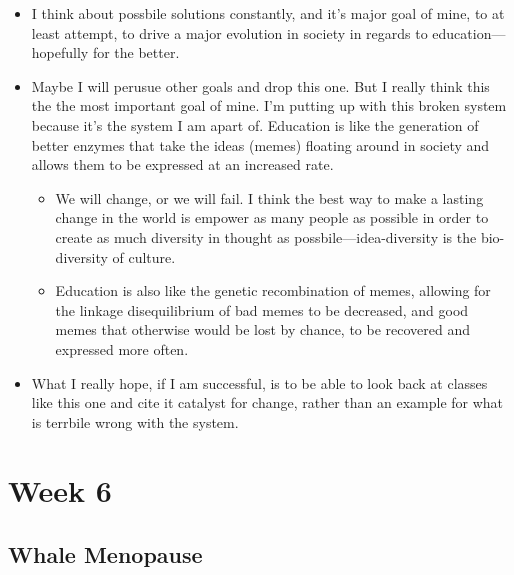 \documentclass[12pt,a4paper]{article}
\begin{document}
    \begin{itemize}
        \item I think about possbile solutions constantly, and it's major goal of mine, to at least attempt, to drive a major evolution in society in regards to education---hopefully for the better.
        \item Maybe I will perusue other goals and drop this one. But I really think this the the most important goal of mine. I'm putting up with this broken system because it's the system I am apart of. Education is like the generation of better enzymes that take the ideas (memes) floating around in society and allows them to be expressed at an increased rate. 
            \begin{itemize}
                \item We will change, or we will fail. I think the best way to make a lasting change in the world is empower as many people as possible in order to create as much diversity in thought as possbile---idea-diversity is the bio-diversity of culture.
                \item Education is also like the genetic recombination of memes, allowing for the linkage disequilibrium of bad memes to be decreased, and good memes that otherwise would be lost by chance, to be recovered and expressed more often.
            \end{itemize}
        \item What I really hope, if I am successful, is to be able to look back at classes like this one and cite it catalyst for change, rather than an example for what is terrbile wrong with the system.
    \end{itemize}

\clearpage
\section*{Week 6}

\subsection{Whale Menopause}
\end{document}
